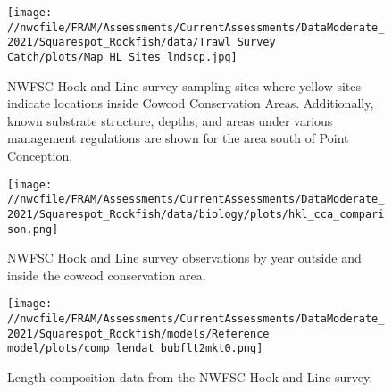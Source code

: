 \documentclass[11pt,
  english,
  a4paper,
]{article}
\begin{document}
\tagmcend\tagstructend


\begin{figure}
\centering
\texttt{[image: //nwcfile/FRAM/Assessments/CurrentAssessments/DataModerate\_2021/Squarespot\_Rockfish/data/Trawl Survey Catch/plots/Map\_HL\_Sites\_lndscp.jpg]}
\caption{NWFSC Hook and Line survey sampling sites where yellow sites indicate locations inside Cowcod Conservation Areas. Additionally, known substrate structure, depths, and areas under various management regulations are shown for the area south of Point Conception.\label{fig:hkl-sites}}
\end{figure}

\tagmcend\tagstructend


\begin{figure}
\centering
\texttt{[image: //nwcfile/FRAM/Assessments/CurrentAssessments/DataModerate\_2021/Squarespot\_Rockfish/data/biology/plots/hkl\_cca\_comparison.png]}
\caption{NWFSC Hook and Line survey observations by year outside and inside the cowcod conservation area.\label{fig:hkl-cca}}
\end{figure}

\tagmcend\tagstructend


\begin{figure}
\centering
\texttt{[image: //nwcfile/FRAM/Assessments/CurrentAssessments/DataModerate\_2021/Squarespot\_Rockfish/models/Reference model/plots/comp\_lendat\_bubflt2mkt0.png]}
\caption{Length composition data from the NWFSC Hook and Line survey.\label{fig:hkl-len-data}}
\end{figure}

\tagmcend\tagstructend

\end{document}
